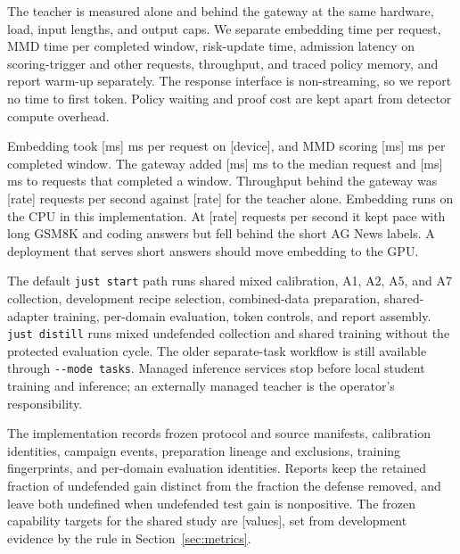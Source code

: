 \documentclass[journal]{IEEEtran}
\newcommand{\tbd}[1]{\textcolor{red!65!black}{[#1]}}
\begin{document}
The teacher is measured alone and behind the gateway at the same hardware, load, input lengths, and output caps. We separate embedding time per request, MMD time per completed window, risk-update time, admission latency on scoring-trigger and other requests, throughput, and traced policy memory, and report warm-up separately. The response interface is non-streaming, so we report no time to first token. Policy waiting and proof cost are kept apart from detector compute overhead.

Embedding took \tbd{ms} ms per request on \tbd{device}, and MMD scoring \tbd{ms} ms per completed window. The gateway added \tbd{ms} ms to the median request and \tbd{ms} ms to requests that completed a window. Throughput behind the gateway was \tbd{rate} requests per second against \tbd{rate} for the teacher alone. Embedding runs on the CPU in this implementation. At \tbd{rate} requests per second it kept pace with long GSM8K and coding answers but fell behind the short AG News labels. A deployment that serves short answers should move embedding to the GPU.

The default \texttt{just start} path runs shared mixed calibration, A1, A2, A5, and A7 collection, development recipe selection, combined-data preparation, shared-adapter training, per-domain evaluation, token controls, and report assembly. \texttt{just distill} runs mixed undefended collection and shared training without the protected evaluation cycle. The older separate-task workflow is still available through \texttt{-{}-mode tasks}. Managed inference services stop before local student training and inference; an externally managed teacher is the operator's responsibility.

The implementation records frozen protocol and source manifests, calibration identities, campaign events, preparation lineage and exclusions, training fingerprints, and per-domain evaluation identities. Reports keep the retained fraction of undefended gain distinct from the fraction the defense removed, and leave both undefined when undefended test gain is nonpositive. The frozen capability targets for the shared study are \tbd{values}, set from development evidence by the rule in Section~\ref{sec:metrics}.
\end{document}
